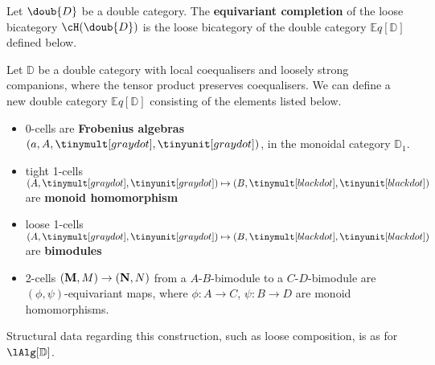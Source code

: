  
 
 



Let $\doub{D}$ be a double category. The {\bf equivariant completion} of the loose bicategory $\cH(\doub{D})$ is the loose bicategory of the double category $\mathbb{E}q[{\mathbb{D}}]$ defined below.  

\begin{defn}
Let ${\mathbb{D}}$ be a double category with local coequalisers and loosely strong companions, where the tensor product preserves coequalisers. We can define a new double category $\mathbb{E}q[{\mathbb{D}}]$ consisting of the elements listed below.


\begin{itemize}
\item 0-cells are {\bf Frobenius algebras} $(a, A,\tinymult[gray dot], \tinyunit[gray dot])$, in the monoidal category ${\mathbb{D}_1}$. 
\item tight 1-cells $(A,\tinymult[gray dot], \tinyunit[gray dot]) \mapsto (B,\tinymult[black dot], \tinyunit[black dot])$ are {\bf monoid homomorphism}
\item loose 1-cells $(A,\tinymult[gray dot], \tinyunit[gray dot]) \mapsto (B,\tinymult[black dot], \tinyunit[black dot])$ are {\bf bimodules}
\item 2-cells $({\bf M},M) \rightarrow ({\bf N},N)$ from a $A$-$B$-bimodule to a $C$-$D$-bimodule are $(\phi, \psi)$-equivariant maps, where $\phi:  A\rightarrow C$, $\psi: B \rightarrow D$ are monoid homomorphisms.  
\end{itemize}

Structural data regarding this construction, such as loose composition, is as for $\lAlg[{\mathbb{D}}]$.
\end{defn}

